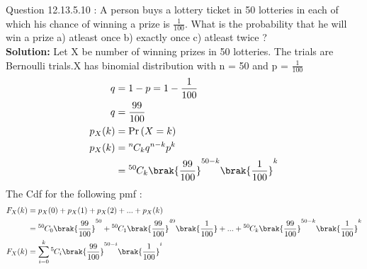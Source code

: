 \documentclass[journal,12pt,twocolumn]{IEEEtran}
\theoremstyle{remark}
\begin{document}
\newcommand{\solution}{\noindent \textbf{Solution: }}
\newcommand{\cosec}{\,\text{cosec}\,}
\providecommand{\dec}[2]{\ensuremath{\overset{#1}{\underset{#2}{\gtrless}}}}
\newcommand{\myvec}[1]{\ensuremath{\begin{pmatrix}#1\end{pmatrix}}}
\newcommand{\mydet}[1]{\ensuremath{\begin{vmatrix}#1\end{vmatrix}}}
\newcommand{\myaugvec}[2]{\ensuremath{\begin{amatrix}{#1}#2\end{amatrix}}}
\providecommand{\rank}{\text{rank}}
\providecommand{\pr}[1]{\ensuremath{\Pr\left(#1\right)}}
\providecommand{\qfunc}[1]{\ensuremath{Q\left(#1\right)}}
	\newcommand*{\permcomb}[4][0mu]{{{}^{#3}\mkern#1#2_{#4}}}
\newcommand*{\perm}[1][-3mu]{\permcomb[#1]{P}}
\newcommand*{\comb}[1][-1mu]{\permcomb[#1]{C}}
\providecommand{\qfunc}[1]{\ensuremath{Q\left(#1\right)}}
\providecommand{\gauss}[2]{\mathcal{N}\ensuremath{\left(#1,#2\right)}}
\providecommand{\diff}[2]{\ensuremath{\frac{d{#1}}{d{#2}}}}
\providecommand{\myceil}[1]{\left \lceil #1 \right \rceil }
\newcommand\figref{Fig.~\ref}
\newcommand\tabref{Table~\ref}
\newcommand{\sinc}{\,\text{sinc}\,}
\newcommand{\rect}{\,\text{rect}\,}
\let\vec\mathbf
Question 12.13.5.10 :  A person buys a lottery ticket in 50 lotteries in each of which his chance of winning a prize is $\frac{1}{100}$. What is the probability that he will win a prize a) atleast once b) exactly once c) atleast twice ?\\
\solution Let X be number of winning prizes in 50 lotteries. The trials are Bernoulli trials.X has binomial distribution with n = 50 and p = $\frac{1}{100}$ 
\begin{align}
q &= 1 - p = 1-\frac{1}{100} \\
q &=   \frac{99}{100} \\
p_X(k) &= \pr{X=k} \\
p_X(k) &= \comb{n}{k} q^{n-k}p^{k} \\
        &= \comb{50}{k}\brak{\frac{99}{100}}^{50-k}\brak{\frac{1}{100}}^{k} 
\end{align} 
The Cdf for the following pmf :  
\begin{align}
F_X(k) &= p_X(0) + p_X(1) + p_X(2) + ... + p_X(k) \\
       &= \comb{50}{0}\brak{\frac{99}{100}}^{50} + \comb{50}{1}\brak{\frac{99}{100}}^{49}\brak{\frac{1}{100}} + ... +\comb{50}{k}\brak{\frac{99}{100}}^{50-k}\brak{\frac{1}{100}}^{k}  \\ 
F_X(k) &= \sum_{i=0}^{k} \comb{5}{i}\brak{\frac{99}{100}}^{50-i}\brak{\frac{1}{100}}^{i}
\end{align}
\end{document}
